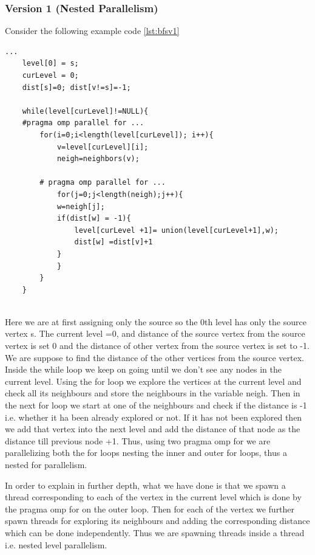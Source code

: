 \documentclass[12pt]{book}
\begin{document}
\subsubsection{Version 1 (Nested Parallelism)}
Consider the following example code \ref{lst:bfsv1}
\begin{lstlisting}[caption={BFS-Example},captionpos=b,label={lst:bfsv1}]
...
    level[0] = s;
    curLevel = 0;
    dist[s]=0; dist[v!=s]=-1;

    while(level[curLevel]!=NULL){
    #pragma omp parallel for ...
        for(i=0;i<length(level[curLevel]); i++){
            v=level[curLevel][i];
            neigh=neighbors(v);

        # pragma omp parallel for ...
            for(j=0;j<length(neigh);j++){
            w=neigh[j];
            if(dist[w] = -1){
                level[curLevel +1]= union(level[curLevel+1],w);
                dist[w] =dist[v]+1
            }
            }
        }
    }
    
\end{lstlisting}
Here we are at first assigning only the source so the 0th level has only the source vertex s. The current level =0, and distance of the source vertex from the source vertex is set 0 and the distance of other vertex from the source vertex is set to -1. We are suppose to find the distance of the other vertices from the source vertex. 
Inside the while loop we keep on going until we don't see any nodes in the current level. Using the for loop we explore the vertices at the current level and check all its neighbours and store the neighbours in the variable neigh. Then in the next for loop we start at one of the neighbours and check if the distance is -1 i.e. whether it ha been already explored or not. If it has not been explored then we add that vertex into the next level and add the distance of that node as the distance till previous node +1. Thus, using two pragma omp for we are parallelizing both the for loops nesting the inner and outer for loops, thus a nested for parallelism.

In order to explain in further depth, what we have done is that we spawn a thread corresponding to each of the vertex in the current level which is done by the pragma omp for on the outer loop. Then for each of the vertex we further spawn threads for exploring its neighbours and adding the corresponding distance which can be done independently. Thus we are spawning threads inside a thread i.e. nested level parallelism.
\end{document}
